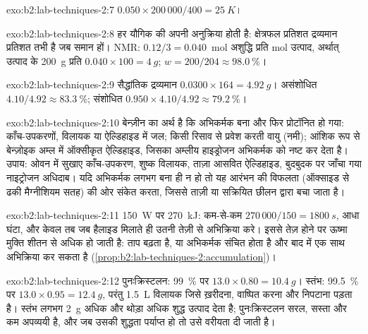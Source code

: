 \begin{solution}{exo:b2:lab-techniques-2:7}
$0.050 \times 200\,000/400 = \qty{25}{K}$।
\end{solution}

\begin{solution}{exo:b2:lab-techniques-2:8}
हर यौगिक की अपनी अनुक्रिया होती है: क्षेत्रफल प्रतिशत द्रव्यमान प्रतिशत तभी है जब 
समान हों। NMR: $0.12/3 = 0.040$~mol अशुद्धि प्रति mol उत्पाद, अर्थात् उत्पाद के \qty{200}{g} प्रति
$0.040 \times 100 = \qty{4}{g}$; $w = 200/204 \approx 98.0~\%$।
\end{solution}

\begin{solution}{exo:b2:lab-techniques-2:9}
सैद्धांतिक द्रव्यमान $0.0300 \times 164 = \qty{4.92}{g}$। असंशोधित $4.10/4.92 \approx 83.3~\%$; संशोधित
$0.950 \times 4.10/4.92 \approx 79.2~\%$।
\end{solution}

\begin{solution}{exo:b2:lab-techniques-2:10}
बेन्ज़ीन का अर्थ है कि अभिकर्मक बना और फिर प्रोटॉनित हो गया: काँच-उपकरणों, विलायक या
ऐल्डिहाइड में जल; किसी रिसाव से प्रवेश करती वायु (नमी); आंशिक रूप से बेन्ज़ोइक अम्ल में ऑक्सीकृत ऐल्डिहाइड, जिसका
अम्लीय हाइड्रोजन अभिकर्मक को नष्ट कर देता है। उपाय: ओवन में सुखाए काँच-उपकरण, शुष्क विलायक, ताज़ा आसवित
ऐल्डिहाइड, बुदबुदक पर जाँचा गया नाइट्रोजन अधिदाब। यदि अभिकर्मक लगभग बना ही न हो तो यह
आरंभन की विफलता (ऑक्साइड से ढकी मैग्नीशियम सतह) की ओर संकेत करता, जिससे ताज़ी या सक्रियित छीलन द्वारा बचा जाता है।
\end{solution}

\begin{solution}{exo:b2:lab-techniques-2:11}
\qty{150}{W} पर \qty{270}{kJ}: कम-से-कम $270\,000/150 = \qty{1800}{s}$, आधा घंटा, और केवल तब जब
हैलाइड मिलाते ही उतनी तेज़ी से अभिक्रिया करे। इससे तेज़ होने पर ऊष्मा मुक्ति शीतन से अधिक हो जाती है: ताप बढ़ता है,
या अभिकर्मक संचित होता है और बाद में एक साथ अभिक्रिया कर सकता है (\cref{prop:b2:lab-techniques-2:accumulation})।
\end{solution}

\begin{solution}{exo:b2:lab-techniques-2:12}
पुनःक्रिस्टलन: 99~\% पर $13.0 \times 0.80 = \qty{10.4}{g}$। स्तंभ: 99.5~\% पर $13.0 \times 0.95 =
\qty{12.4}{g}$, परंतु \qty{1.5}{L} विलायक जिसे ख़रीदना, वाष्पित करना और निपटाना पड़ता है। स्तंभ लगभग
\qty{2}{g} अधिक और थोड़ा अधिक शुद्ध उत्पाद देता है; पुनःक्रिस्टलन सरल, सस्ता और कम
अपव्ययी है, और जब उसकी शुद्धता पर्याप्त हो तो उसे वरीयता दी जाती है।
\end{solution}

